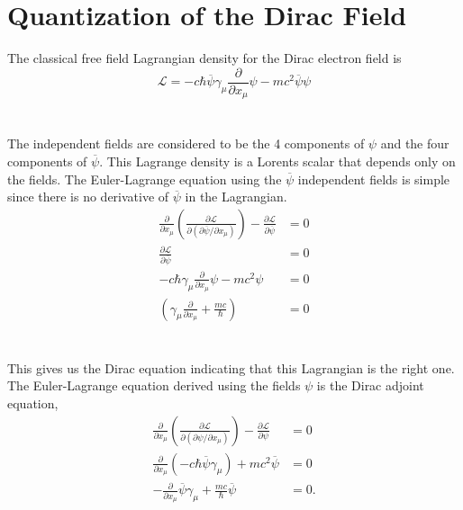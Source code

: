 \documentclass{report}
\begin{document}
\section{Quantization of the Dirac Field}
The classical free field Lagrangian density for the Dirac electron field is
\begin{equation}
	\mathcal{L} = - c \hbar \overline{\psi} \gamma_{\mu} \frac{ \partial }{ \partial x_{\mu} } \psi - mc^2 \overline{\psi}\psi
\end{equation}
\\
\\
The independent fields are considered to be the 4 components of $\displaystyle \psi$ and the four components of $\displaystyle \overline{\psi}$. This Lagrange density is a Lorents scalar that depends only on the fields. The Euler-Lagrange equation using the $\displaystyle \overline{\psi}$ independent fields is simple since there is no derivative of $\displaystyle \overline{\psi}$ in the Lagrangian.
\begin{align*}
	\frac{ \partial  }{ \partial x_{\mu} } \left( \frac{ \partial \mathcal{L} }{ \partial (\partial \overline{\psi} / \partial x_{\mu}) }  \right)  - \frac{ \partial \mathcal{L} }{ \partial \overline{\psi} } & = 0 \\
	\frac{ \partial \mathcal{L} }{ \partial \overline{\psi} }                                                                                                                                                   & = 0 \\
	-c\hbar \gamma_{\mu} \frac{ \partial  }{ \partial x_{\mu} } \psi - mc^2 \psi                                                                                                                                & = 0 \\
	\left( \gamma_{\mu} \frac{ \partial  }{ \partial x_{\mu} } + \frac{mc}{\hbar}  \right)                                                                                                                      & = 0
\end{align*}
\\
\\
This gives us the Dirac equation indicating that this Lagrangian is the right one. The Euler-Lagrange equation derived using the fields $\displaystyle \psi$ is the Dirac adjoint equation,
\begin{align*}
	\frac{ \partial  }{ \partial x_{\mu} }  \left( \frac{ \partial \mathcal{L} }{ \partial  \left( \partial \psi / \partial x_{\mu} \right)  }  \right) - \frac{ \partial \mathcal{L} }{ \partial \psi } & = 0 \\
	\frac{ \partial  }{ \partial x_{\mu} } \left( - c \hbar \overline{\psi} \gamma_{\mu} \right) + mc^2 \overline{\psi}                                                                                  & = 0 \\
	- \frac{ \partial  }{ \partial x_{\mu} } \overline{\psi} \gamma_{\mu} + \frac{mc}{\hbar}\overline{\psi}                                                                                              & = 0
	.\end{align*}
\end{document}
